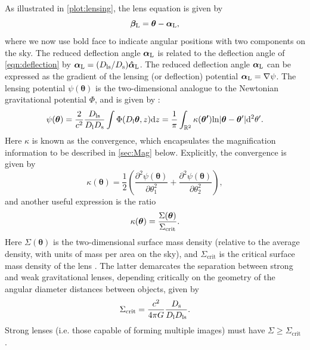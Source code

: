 As illustrated in \autoref{plot:lensing}, the lens equation is given by 
\begin{equation}
\bm{\beta}_{\rm L} = \bm{\theta} - \bm{\alpha}_{\rm L},
\end{equation}
where we now use bold face to indicate angular positions with two components on the sky. The reduced deflection angle $\bm{\alpha}_{\rm L}$ is related to the deflection angle of \autoref{eqn:deflection} by $\bm{\alpha}_{\rm L} = (D_{\rm ls}/D_{\rm s})\bm{\hat{\alpha}}_{\rm L}$. The reduced deflection angle $\bm{\alpha}_{\rm L}$ can be expressed as the gradient of the lensing (or deflection) potential $\bm{\alpha}_{\rm L} = \nabla \psi$. The lensing potential $\psi(\bm{\theta})$ is the two-dimensional analogue to the Newtonian gravitational potential $\Phi$, and is given by \citep{NarayanBartelmann96}:
\begin{equation}
\psi(\bm{\theta}) = \frac{2}{c^2}\frac{D_{\rm ls}}{D_{\rm l} D_{\rm s}} \int \Phi(D_{\rm l} \bm{\theta},z){\rm d}z = \frac{1}{\pi} \int_{\mathbb{R}^2} \kappa(\bm{\theta'}) {\rm ln}|\bm{\theta} - \bm{\theta}'| {\rm d}^2 \theta'.
\end{equation}
Here $\kappa$ is known as the convergence, which encapsulates the magnification information to be described in \autoref{sec:Mag} below. Explicitly, the convergence is given by
\begin{equation}
\label{eqn:kappapartials}
\kappa(\bm{\theta}) =\frac{1}{2} \left( \frac{\partial^2 \psi(\bm{\theta})}{\partial\theta_1^2} + \frac{\partial^2 \psi(\bm{\theta})}{\partial\theta_2^2} \right),
\end{equation}
and another useful expression is the ratio
\begin{equation}
\label{eqn:kappa}
\kappa(\bm{\theta}) = \frac{\Sigma(\bm{\theta})}{\Sigma_{\rm crit}}.
\end{equation}
Here $\Sigma(\bm{\theta})$ is the two-dimensional surface mass density (relative to the average density, with units of mass per area on the sky), and $\Sigma_{\mathrm{crit}}$ is the critical surface mass density of the lens \citep{Wright00}. The latter demarcates the separation between strong and weak gravitational lenses, depending critically on the geometry of the angular diameter distances between objects, given by
\begin{equation}
\label{eqn:sigcrit}
\Sigma_{\mathrm{crit}} = \frac{c^2}{4 \pi G} \frac{D_{\rm s}}{D_{\rm l} D_{\rm ls}}.
\end{equation}
Strong lenses (i.e. those capable of forming multiple images) must have $\Sigma \ge \Sigma_{\mathrm{crit}}$ \citep{Schneider06_IntroGravLensCosmology}.

